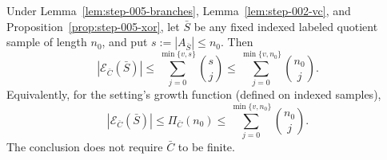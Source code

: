 \begin{lemma}\label{lem:step-005-sauer}
Under Lemma~\ref{lem:step-005-branches}, Lemma~\ref{lem:step-002-vc}, and
Proposition~\ref{prop:step-005-xor}, let \(\bar S\) be any fixed indexed
labeled quotient sample of length \(n_0\), and put
\(s:=|A_{\bar S}|\le n_0\).  Then
\[
|\mathcal E_{\bar C}(\bar S)|
\le \sum_{j=0}^{\min\{v,s\}}\binom{s}{j}
\le \sum_{j=0}^{\min\{v,n_0\}}\binom{n_0}{j}.
\tag{8}
\]
Equivalently, for the setting's growth function (defined on indexed
samples),
\[
|\mathcal E_{\bar C}(\bar S)|
\le \Pi_{\bar C}(n_0)
\le \sum_{j=0}^{\min\{v,n_0\}}\binom{n_0}{j}.
\tag{9}
\]
The conclusion does not require \(\bar C\) to be finite.


\end{lemma}

